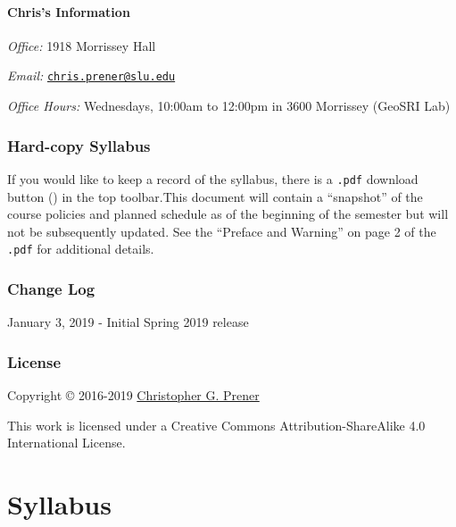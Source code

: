 \documentclass[]{book}
\begin{document}
\hypertarget{chriss-information}{%
\subsection*{Chris's Information}\label{chriss-information}}

\emph{Office:} 1918 Morrissey Hall

\emph{Email:} \href{mailto:chris.prener@slu.edu}{\nolinkurl{chris.prener@slu.edu}}

\emph{Office Hours:} Wednesdays, 10:00am to 12:00pm in 3600 Morrissey (GeoSRI Lab)

\hypertarget{hard-copy-syllabus}{%
\section*{Hard-copy Syllabus}\label{hard-copy-syllabus}}

If you would like to keep a record of the syllabus, there is a \texttt{.pdf} download button () in the top toolbar.This document will contain a ``snapshot'' of the course policies and planned schedule as of the beginning of the semester but will not be subsequently updated. See the ``Preface and Warning'' on page 2 of the \texttt{.pdf} for additional details.

\hypertarget{change-log}{%
\section*{Change Log}\label{change-log}}

January 3, 2019 - Initial Spring 2019 release

\hypertarget{license}{%
\section*{License}\label{license}}

Copyright © 2016-2019 \href{https://chris-prener.github.io}{Christopher G. Prener}

This work is licensed under a Creative Commons Attribution-ShareAlike 4.0 International License.

\hypertarget{part-syllabus}{%
\part{Syllabus}\label{part-syllabus}}
\end{document}

